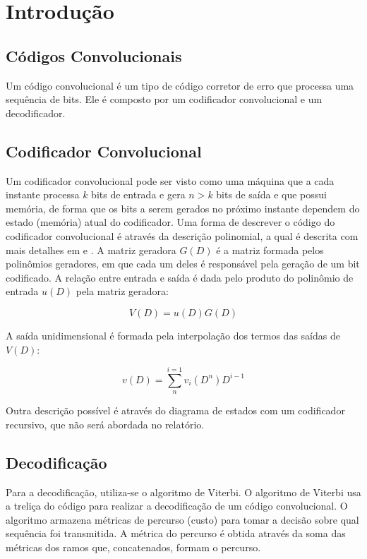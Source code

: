 \section{Introdução}

\subsection{Códigos Convolucionais}

Um código convolucional é um tipo de código corretor de erro que processa uma sequência de bits. Ele é composto por um codificador convolucional e um decodificador.


\subsection{Codificador Convolucional}

Um codificador convolucional pode ser visto como uma máquina que a cada instante processa $k$ bits de entrada e gera $n > k$ bits de saída e que possui memória, de forma que os bits a serem gerados no próximo instante dependem do estado (memória) atual do codificador.
Uma forma de descrever o código do codificador convolucional é através da descrição polinomial, a qual é descrita com mais detalhes em \cite{ref:roteiro2} e \cite{ref:roteiro3}. A matriz geradora $G(D)$ é a matriz formada pelos polinômios geradores, em que cada um deles é responsável pela geração de um bit codificado. A relação entre entrada e saída é dada pelo produto do polinômio de entrada $u(D)$ pela matriz geradora:

\begin{equation}
V(D)=u(D)G(D)
\end{equation}

A saída unidimensional é formada pela interpolação dos termos das saídas de $V(D)$:

\begin{equation}
v(D)= \sum_{n}^{i=1} v_{i}(D^{n})D^{i-1}
\end{equation}

Outra descrição possível é através do diagrama de estados com um codificador recursivo, que não será abordada no relatório. 

\subsection{Decodificação}
Para a decodificação, utiliza-se o algoritmo de Viterbi. O algoritmo de Viterbi usa a treliça do código para realizar a decodificação de um código convolucional. O algoritmo armazena métricas de percurso (custo) para tomar a decisão sobre qual sequência foi transmitida. A métrica do percurso é obtida através da soma das métricas dos ramos que, concatenados, formam o percurso.


